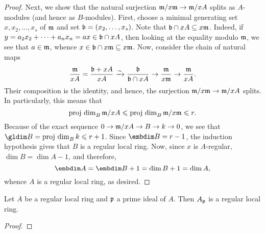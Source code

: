 \begin{proof}
    Next, we show that the natural surjection $\mathfrak{m}/x\mathfrak{m}\to \mathfrak{m}/xA$ splits as $A$-modules (and hence as $B$-modules). First, choose a minimal generating set $x, x_2,\dots,x_s$ of $\mathfrak{m}$ and set $\mathfrak{b} = (x_2,\dots,x_s)$. Note that $\mathfrak{b}\cap xA\subseteq x\mathfrak{m}$. Indeed, if $y = a_2x_2 + \dots + a_nx_n = ax\in \mathfrak{b}\cap xA$, then looking at the equality modulo $\mathfrak{m}$, we see that $a\in\mathfrak{m}$, whence $x\in\mathfrak{b}\cap x\mathfrak{m}\subseteq x\mathfrak{m}$. Now, consider the chain of natural maps 
    \begin{equation*}
        \frac{\mathfrak{m}}{xA} = \frac{\mathfrak{b} + xA}{xA}\xrightarrow{\sim}\frac{\mathfrak{b}}{\mathfrak{b}\cap xA}\to\frac{\mathfrak{m}}{x\mathfrak{m}}\to\frac{\mathfrak{m}}{xA}.
    \end{equation*}
    Their composition is the identity, and hence, the surjection $\mathfrak{m}/x\mathfrak{m}\to \mathfrak{m}/xA$ splits. In particularly, this means that 
    \begin{equation*}
        \operatorname{proj~dim}_B \mathfrak{m}/xA\leqslant\operatorname{proj~dim}_B \mathfrak{m}/x\mathfrak{m}\leqslant r.
    \end{equation*}
    Because of the exact sequence $0\to\mathfrak{m}/xA\to B\to k\to 0$, we see that $\gldim B = \projdim_B k\le r + 1$. Since $\embdim B = r - 1$, the induction hypothesis gives that $B$ is a regular local ring. Now, since $x$ is $A$-regular, $\dim B = \dim A - 1$, and therefore, 
    \begin{equation*}
        \embdim A = \embdim B + 1 = \dim B + 1 = \dim A,
    \end{equation*}
    whence $A$ is a regular local ring, as desired.
\end{proof}

\begin{theorem}[Serre]
    Let $A$ be a regular local ring and $\mathfrak{p}$ a prime ideal of $A$. Then $A_{\mathfrak{p}}$ is a regular local ring.
\end{theorem}
\begin{proof}

\end{proof}
